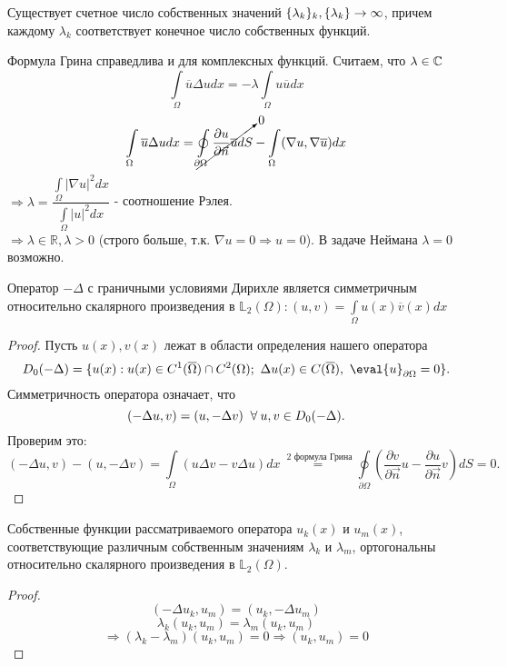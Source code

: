\begin{statement}
Существует счетное число собственных значений $\{\lambda_k\}_k,  \\ \{\lambda_k\} \to \infty$, причем каждому $\lambda_k$ соответствует конечное число собственных функций.
\end{statement} 
Формула Грина справедлива и для комплексных функций. Считаем, что $\lambda \in \mathbb{C}$
$$
\int\limits_{\Omega} \overline{u} \Delta u dx = - \lambda \int\limits_{\Omega} u \overline{u} dx$$
$$
\int\limits_{\Omega} \overline{u} \Delta u dx = \cancelto{0}{\oint\limits_{\partial \Omega} \frac{\partial u}{\partial \vec{n}} \overline{u} dS }- \int\limits_{\Omega} (\nabla u, \nabla \overline{u}) dx$$
$\Rightarrow \lambda = \dfrac{\int\limits_{\Omega}|\nabla u|^2 dx}{\int\limits_{\Omega}|u|^2 dx}$ - соотношение Рэлея.\\
$\Rightarrow \lambda \in \mathbb{R}, \lambda >0 $ (строго больше, т.к. $\nabla u = 0 \Rightarrow u =0$). В задаче Неймана $\lambda = 0$ возможно.\\
\begin{statement} Оператор $-\Delta$ с граничными условиями Дирихле является симметричным относительно скалярного произведения в $\mathbb{L}_2(\Omega): (u,v) = \int\limits_{\Omega} u(x) \overline{v}(x)dx $ 
\end{statement}
\begin{proof}
Пусть $u(x), v(x)$ лежат в области  определения нашего оператора $$D_0(-\Delta) = \{u(x): u(x) \in C^1(\overline{\Omega}) \cap C^2(\Omega); \ \Delta u(x) \in C(\overline{\Omega}), \ \eval{u}_{\partial \Omega} = 0 \}.$$
Симметричность оператора означает, что $$(-\Delta u,v)=(u, -\Delta v) \;\;\forall\: u,v \in D_0(-\Delta).$$ Проверим это: $$ (-\Delta u,v) - (u, -\Delta v) = \int\limits_{\Omega} (u \Delta v- v \Delta u)dx \stackrel{\text{ 2 формула Грина}}{=} \oint \limits_{\partial \Omega} ( \frac{\partial v}{\partial \vec{n}}u - \frac{\partial u}{\partial \vec{n}}v) dS =0.$$
\end{proof}
\begin{statement} Собственные функции рассматриваемого оператора $u_k(x)$ и $u_m(x)$, соответствующие различным собственным значениям $\lambda_k$ и $\lambda_m$, ортогональны относительно скалярного произведения в $\mathbb{L}_2(\Omega)$.
\end{statement}
\begin{proof}
$$(-\Delta u_k, u_m) = (u_k, -\Delta u_m)$$ $$\lambda_k (u_k, u_m)=  \lambda_m (u_k, u_m)$$ $$\Rightarrow (\lambda_k - \lambda_m) (u_k, u_m) = 0 \Rightarrow (u_k, u_m) = 0 $$
\end{proof}
 
 